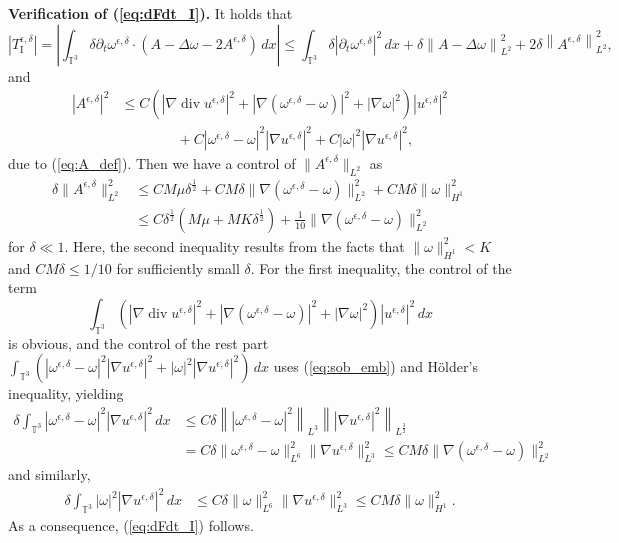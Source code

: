 \documentclass[reqno,10pt]{amsart}
\theoremstyle{definition}
\theoremstyle{remark}
\numberwithin{equation}{section}
\DeclareMathOperator{\dive}{div}
\begin{document}
\textbf{Verification of (\ref{eq:dFdt_I}).} It holds that
\[
      |T^{\epsilon,\delta}_\text{I}| = \left|\int_{\mathbb T^3} \delta \partial_t\omega^{\epsilon,\delta} \cdot \left( A-\Delta \omega - 2A^{\epsilon,\delta} \right)\,dx\right|
    \le \int_{\mathbb T^3} \delta \left|\partial_t\omega^{\epsilon,\delta}\right|^2\, dx + \delta {\| A-\Delta \omega\|}_{L^2}^2 + 2\delta\left\| A^{\epsilon,\delta} \right\|_{L^2}^2,
\]
and
\[
\begin{aligned}
    |A^{\epsilon,\delta}|^2  &\le C \left(|\nabla\dive u^{\epsilon,\delta}|^2 + |\nabla(\omega^{\epsilon,\delta}-\omega)|^2 + |\nabla\omega|^2 \right) |u^{\epsilon,\delta}|^2 \\[1.2ex]
    &\qquad \qquad + C|\omega^{\epsilon,\delta}-\omega|^2 |\nabla u^{\epsilon,\delta}|^2 + C|\omega|^2 |\nabla u^{\epsilon,\delta}|^2,
\end{aligned}
\]
due to (\ref{eq:A_def}). Then we have a control of $\|A^{\epsilon,\delta}\|_{L^2}$ as
\[
\begin{aligned}
    \delta \|A^{\epsilon,\delta}\|_{L^2}^2 &\le CM\mu\delta^{\frac{1}{2}} + CM\delta\|\nabla (\omega^{\epsilon,\delta}-\omega)\|_{L^2}^2 + CM\delta \|\omega\|_{H^1}^2 \\
    &\le C\delta^{\frac{1}{2}}\left( M\mu + MK\delta^{\frac{1}{2}} \right) + \frac{1}{10} \|\nabla (\omega^{\epsilon,\delta}-\omega)\|_{L^2}^2
\end{aligned}
\]
for $\delta\ll 1$. Here, the second inequality results from the facts that $\|\omega\|_{H^1}^2< K$ and $CM\delta\le 1/10$ for sufficiently small $\delta$. For the first inequality, the control of the term 
\[
    \int_{\mathbb T^3} \left(|\nabla\dive u^{\epsilon,\delta}|^2 + |\nabla(\omega^{\epsilon,\delta}-\omega)|^2 + |\nabla\omega|^2 \right) |u^{\epsilon,\delta}|^2\,dx
\]
is obvious, and the control of the rest part $\int_{\mathbb T^3} \left( |\omega^{\epsilon,\delta}-\omega|^2 |\nabla u^{\epsilon,\delta}|^2 + |\omega|^2 |\nabla u^{\epsilon,\delta}|^2 \right) \,dx$ uses (\ref{eq:sob_emb}) and H{\"o}lder's inequality, yielding
\[
\begin{aligned}
    \delta\int_{\mathbb T^3} |\omega^{\epsilon,\delta}-\omega|^2 |\nabla u^{\epsilon,\delta}|^2 \,dx
    &\le C\delta \left\| |\omega^{\epsilon,\delta}-\omega|^2 \right\|_{L^3} \left\| |\nabla u^{\epsilon,\delta}|^2 \right\|_{L^{\frac{3}{2}}} \\
    &=C\delta \|\omega^{\epsilon,\delta}-\omega\|_{L^6}^2 \|\nabla u^{\epsilon,\delta}\|_{L^3}^2
    \le CM\delta \|\nabla(\omega^{\epsilon,\delta}-\omega)\|_{L^2}^2
\end{aligned}
\]
and similarly,
\[
\begin{aligned}
    \delta \int_{\mathbb T^3} |\omega|^2 |\nabla u^{\epsilon,\delta}|^2 \,dx
    &\le C\delta \|\omega\|_{L^6}^2 \|\nabla u^{\epsilon,\delta}\|_{L^3}^2 \le CM\delta \|\omega\|_{H^1}^2.
\end{aligned}
\]
As a consequence, (\ref{eq:dFdt_I}) follows.
\end{document}
